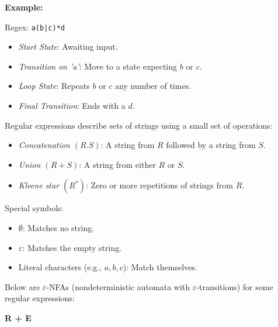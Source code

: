 \textbf{Example:}

Regex: \texttt{a(b|c)*d}

\begin{itemize}
    
    \item \emph{Start State}: Awaiting input.
    
    \item \emph{Transition on 'a'}: Move to a state expecting \( b \) or \( c \).
    
    \item \emph{Loop State}: Repeats \( b \) or \( c \) any number of times.
    
    \item \emph{Final Transition}: Ends with a \( d \).

\end{itemize}

Regular expressions describe sets of strings using a small set of operations:

\begin{itemize}
    
    \item \emph{Concatenation \((R.S)\)}: A string from \(R\) followed by a string from \(S\).
    
    \item \emph{Union \((R + S)\)}: A string from either \(R\) or \(S\).
    
    \item \emph{Kleene star \((R^*)\)}: Zero or more repetitions of strings from \(R\).

\end{itemize}

Special symbols:

\begin{itemize}
   
    \item \(\emptyset\): Matches no string.
   
    \item \(\varepsilon\): Matches the empty string.
   
    \item Literal characters (e.g., \(a, b, c\)): Match themselves.

\end{itemize}

Below are \(\varepsilon\)-NFAs (nondeterministic automata with \(\varepsilon\)-transitions) for some 
regular expressions:

\textbf{R + E}

